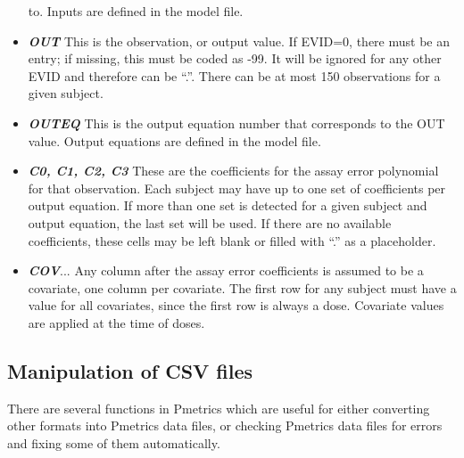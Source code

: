 \documentclass[
]{book}
\begin{document}
\begin{itemize}
  to. Inputs are defined in the model file.
\item
  \textbf{\emph{OUT}} This is the observation, or output value. If EVID=0, there
  must be an entry; if missing, this must be coded as -99. It will be
  ignored for any other EVID and therefore can be ``.''. There can be at
  most 150 observations for a given subject.
\item
  \textbf{\emph{OUTEQ}} This is the output equation number that corresponds to the
  OUT value. Output equations are defined in the model file.
\item
  \textbf{\emph{C0, C1, C2, C3}} These are the coefficients for the assay error
  polynomial for that observation. Each subject may have up to one set
  of coefficients per output equation. If more than one set is detected
  for a given subject and output equation, the last set will be used. If
  there are no available coefficients, these cells may be left blank or
  filled with ``.'' as a placeholder.
\item
  \textbf{\emph{COV}}... Any column after the assay error coefficients is assumed
  to be a covariate, one column per covariate. The first row for any subject
  must have a value for all covariates, since the first row is always a dose.
  Covariate values are applied at the time of doses.
\end{itemize}

\hypertarget{manipulation-of-csv-files}{%
\subsection{Manipulation of CSV files}\label{manipulation-of-csv-files}}

There are several functions in Pmetrics which are useful for either
converting other formats into Pmetrics data files, or checking Pmetrics
data files for errors and fixing some of them automatically.
\end{document}

